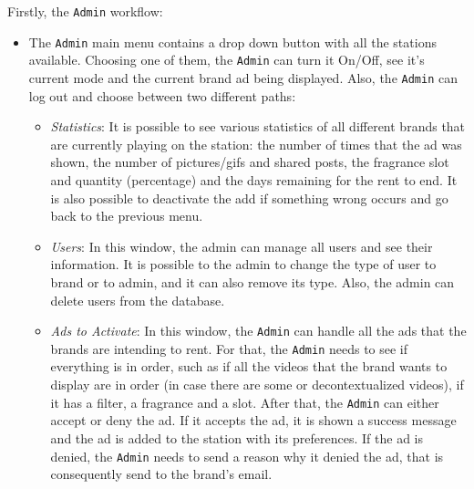 Firstly, the \texttt{Admin} workflow:
%
\begin{itemize}
\item The \texttt{Admin} main menu contains a drop down button with all the stations available. Choosing one of them, the \texttt{Admin} can turn it On/Off, see it's current mode and the current brand ad being displayed. Also, the \texttt{Admin}  can log out and choose between two different paths:
%
\begin{itemize}
\item \emph{Statistics}: It is possible to see various statistics of all different brands that are currently playing on the station: the number of times that the ad was shown, the number of pictures/\gls{gif}s and shared posts, the fragrance slot and quantity (percentage) and the days remaining for the rent to end.
It is also possible to deactivate the add if something wrong occurs and go back to the previous menu.
\item \emph{Users}: In this window, the admin can manage all users and see their information.
It is possible to the admin to change the type of user to brand or to admin, and it can also remove its type.
Also, the admin can delete users from the database. 
\item \emph{Ads to Activate}: In this window, the \texttt{Admin} can handle all the ads that the brands are intending to rent.
For that, the \texttt{Admin} needs to see if everything is in order, such as if all the videos that the brand wants to display are in order (in case there are some  or decontextualized videos), if it has a filter, a fragrance and a slot.
After that, the \texttt{Admin} can either accept or deny the ad.
If it accepts the ad, it is shown a success message and the ad is added to the station with its preferences.
If the ad is denied, the \texttt{Admin} needs to send a reason why it denied the ad, that is consequently send to the brand's email.
\end{itemize}
%
\end{itemize}

